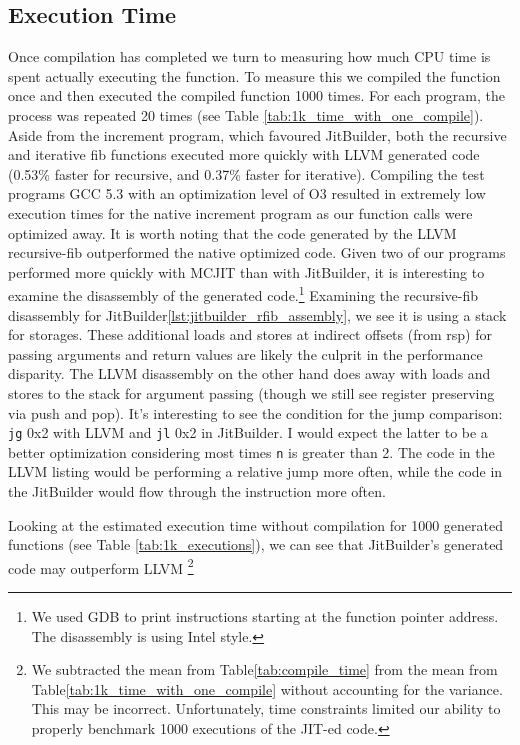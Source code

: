 \subsection{Execution Time}
Once compilation has completed we turn to measuring how much CPU time is spent actually executing the function.
To measure this we compiled the function once and then executed the compiled function 1000 times.
For each program, the process was repeated 20 times (see Table \ref{tab:1k_time_with_one_compile}).
Aside from the increment program, which favoured JitBuilder, both the recursive and iterative fib functions executed more quickly with LLVM generated code (0.53\% faster for recursive, and 0.37\% faster for iterative).
Compiling the test programs GCC 5.3 with an optimization level of O3 resulted in extremely low execution times for the native increment program as our function calls were optimized away.
It is worth noting that the code generated by the LLVM recursive-fib outperformed the native optimized code.
Given two of our programs performed more quickly with MCJIT than with JitBuilder, it is interesting to examine the disassembly of the generated code.\footnote{We used GDB to print instructions starting at the function pointer address. The disassembly is using Intel style.}
Examining the recursive-fib disassembly for JitBuilder\ref{lst:jitbuilder_rfib_assembly}, we see it is using a stack for storages. These additional loads and stores at indirect offsets (from rsp) for passing arguments and return values are likely the culprit in the performance disparity.
The LLVM disassembly on the other hand does away with loads and stores to the stack for argument passing (though we still see register preserving via push and pop).
It's interesting to see the condition for the jump comparison: \texttt{jg} 0x2 with LLVM and \texttt{jl} 0x2 in JitBuilder. I would expect the latter to be a better optimization considering most times \texttt{n} is greater than 2.
The code in the LLVM listing would be performing a relative jump more often, while the code in the JitBuilder would flow through the instruction more often.

Looking at the estimated execution time without compilation for 1000 generated functions (see Table \ref{tab:1k_executions}), we can see that JitBuilder's generated code may outperform LLVM \footnote{We subtracted the mean from Table\ref{tab:compile_time} from the mean from Table\ref{tab:1k_time_with_one_compile} without accounting for the variance. This may be incorrect. Unfortunately, time constraints limited our ability to properly benchmark 1000 executions of the JIT-ed code.}

